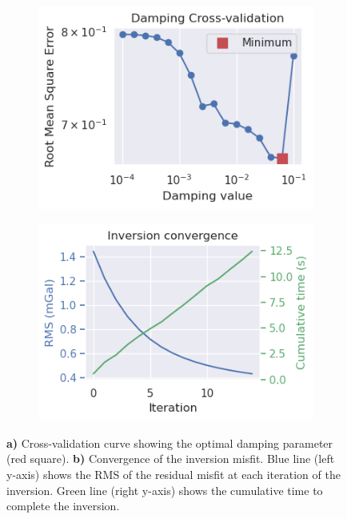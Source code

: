 \begin{figure}[!ht]
  \centering
    \begin{subfigure}[t]{.45\textwidth}
        \centering
        \includegraphics[width=\textwidth]{figures/chp3/chp3_Ross_Sea_CV.png}
        \caption{}
    \end{subfigure}
    \begin{subfigure}[t]{.45\textwidth}
        \centering
        \includegraphics[width=\textwidth]{figures/chp3/chp3_Ross_Sea_convergence.png}
        \caption{}
    \end{subfigure}
  \caption[Ross Sea inversion, CV and convergence]{\textbf{a)} Cross-validation curve showing the optimal damping parameter (red square). \textbf{b)} Convergence of the inversion misfit. Blue line (left y-axis) shows the RMS of the residual misfit at each iteration of the inversion. Green line (right y-axis) shows the cumulative time to complete the inversion. 
  }
    \label{fig:chp3_Ross_Sea_CV_and_convergence}
\end{figure}

